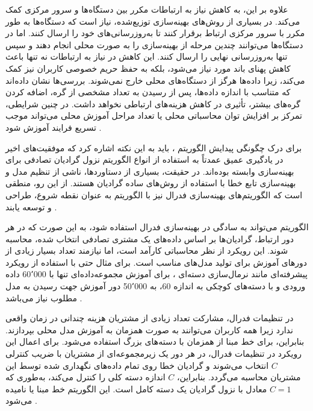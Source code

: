 علاوه بر این،
به کاهش نیاز به ارتباطات مکرر بین دستگاه‌ها و سرور مرکزی کمک می‌کند. در بسیاری از روش‌های بهینه‌سازی توزیع‌شده، نیاز است که دستگاه‌ها به طور مکرر با سرور مرکزی ارتباط برقرار کنند تا به‌روزرسانی‌های خود را ارسال کنند. اما در
دستگاه‌ها می‌توانند چندین مرحله از بهینه‌سازی را به صورت محلی انجام دهند و سپس تنها به‌روزرسانی نهایی را ارسال کنند. این کاهش در نیاز به ارتباطات نه تنها باعث کاهش پهنای باند مورد نیاز می‌شود، بلکه به حفظ حریم خصوصی کاربران نیز کمک می‌کند، زیرا داده‌ها هرگز از دستگاه‌های محلی خارج نمی‌شوند. بررسی‌ها نشان داده‌اند که متناسب با اندازه داده‌ها، پس از رسیدن به تعداد مشخصی از گره، اضافه کردن گره‌های بیشتر، تأثیری در کاهش هزینه‌های ارتباطی نخواهد داشت. در چنین شرایطی، تمرکز بر افزایش توان محاسباتی محلی یا تعداد مراحل آموزش محلی می‌تواند موجب تسریع فرایند آموزش شود
\cite{mcmahan2017communication}.

برای درک چگونگی پیدایش الگوریتم
%
، باید به این نکته اشاره کرد که موفقیت‌های اخیر در یادگیری عمیق عمدتاً به استفاده از انواع الگوریتم نزول گرادیان تصادفی%
برای بهینه‌سازی وابسته بوده‌اند. در حقیقت، بسیاری از دستاوردها، ناشی از تنظیم مدل و بهینه‌سازی تابع خطا با استفاده از روش‌های ساده گرادیان هستند. از این رو، منطقی است که الگوریتم‌های بهینه‌سازی فدرال نیز با الگوریتم
به عنوان نقطه شروع، طراحی و توسعه یابند
\cite{mcmahan2017communication}.


الگوریتم
می‌تواند به سادگی در بهینه‌سازی فدرال استفاده شود، به این صورت که در هر دور ارتباط، گرادیان‌ها بر اساس داده‌های یک مشتری تصادفی انتخاب شده، محاسبه ‌شوند. این رویکرد از نظر محاسباتی کارآمد است، اما نیازمند تعداد بسیار زیادی از دورهای آموزش برای تولید مدل‌های مناسب است.
برای مثال حتی با استفاده از رویکرد پیشرفته‌ای مانند نرمال‌سازی دسته‌ای%
%
، برای آموزش مجموعه‌داده‌ای تنها با 60٬000 داده ورودی و
با دسته‌های کوچکی به اندازه 60، به 50٬000 دور آموزش جهت رسیدن به مدل مطلوب نیاز می‌باشد
\cite{ioffe2015batch}.

در تنظیمات فدرال، مشارکت تعداد زیادی از مشتریان هزینه چندانی در زمان واقعی ندارد زیرا همه کاربران می‌توانند به صورت همزمان به آموزش مدل محلی بپردازند. بنابراین، برای خط مبنا از
همزمان با دسته‌های بزرگ استفاده می‌شود. برای اعمال این رویکرد در تنظیمات فدرال، در هر دور یک زیرمجموعه‌ای از مشتریان با ضریب کنترلی 
$C$
انتخاب می‌شوند و گرادیان خطا روی تمام داده‌های نگهداری شده توسط این مشتریان محاسبه می‌گردد. بنابراین،
$C$
اندازه دسته کلی را کنترل می‌کند، به‌طوری که
$C = 1$
معادل با نزول گرادیان یک دسته کامل است. این الگوریتم خط مبنا
یا
نامیده می‌شود
\cite{mcmahan2017communication}.


